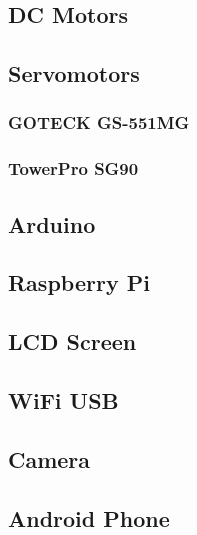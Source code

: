 \subsection{DC Motors}



\subsection{Servomotors}
	\subsubsection{GOTECK GS-551MG}



	\subsubsection{TowerPro SG90}



\subsection{Arduino}



\subsection{Raspberry Pi}



\subsection{LCD Screen}



\subsection{WiFi USB}



\subsection{Camera}



\subsection{Android Phone}



